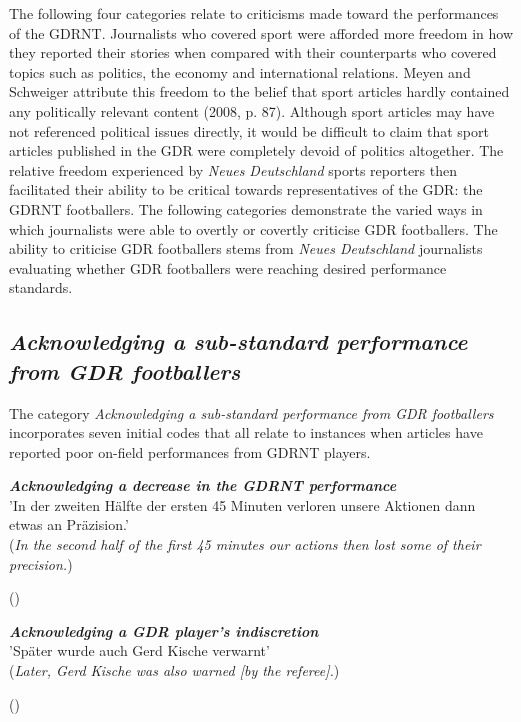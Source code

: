The following four categories relate to criticisms made toward the performances of the GDRNT. Journalists who covered sport were afforded more freedom in how they reported their stories when compared with their counterparts who covered topics such as politics, the economy and international relations. Meyen and Schweiger attribute this freedom to the belief that sport articles hardly contained any politically relevant content (2008, p. 87). Although sport articles may have not referenced political issues directly, it would be difficult to claim that sport articles published in the GDR were completely devoid of politics altogether. The relative freedom experienced by \textit{Neues Deutschland} sports reporters then facilitated their ability to be critical towards representatives of the GDR: the GDRNT footballers. The following categories demonstrate the varied ways in which journalists were able to overtly or covertly criticise GDR footballers. The ability to criticise GDR footballers stems from \textit{Neues Deutschland} journalists evaluating whether GDR footballers were reaching desired performance standards.

\subsection*{\textit{Acknowledging a sub-standard performance from GDR footballers}}

The category \textit{Acknowledging a sub-standard performance from GDR footballers} incorporates seven initial codes that all relate to instances when articles have reported poor on-field performances from GDRNT players.

\begin{displayquote}
\begin{small}
\textbf{\textit{Acknowledging a decrease in the GDRNT performance}}\\
'In der zweiten Hälfte der ersten 45 Minuten verloren unsere Aktionen dann etwas an Präzision.'\\
(\textit{In the second half of the first 45 minutes our actions then lost some of their precision.})\
\begin{flushright}\footnotesize (\cite{nd19740619})\end{flushright}
\end{small}
\end{displayquote}

\begin{displayquote}
\begin{small}
\textbf{\textit{Acknowledging a GDR player’s indiscretion}}\\
'Später wurde auch Gerd Kische verwarnt'\\
(\textit{Later, Gerd Kische was also warned [by the referee].})\
\begin{flushright}\footnotesize (\cite{nd19740619})\end{flushright}
\end{small}
\end{displayquote}

